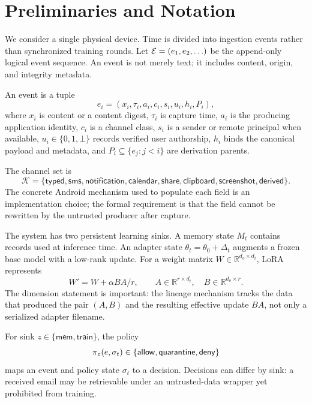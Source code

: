 \section{Preliminaries and Notation}
\label{sec:preliminaries}

We consider a single physical device. Time is divided into ingestion events rather than synchronized training rounds. Let $\mathcal{E}=(e_1,e_2,\ldots)$ be the append-only logical event sequence. An event is not merely text; it includes content, origin, and integrity metadata.

\begin{definition}
An event is a tuple
\begin{equation}
e_i=(x_i,\tau_i,a_i,c_i,s_i,u_i,h_i,P_i),
\label{eq:event}
\end{equation}
where $x_i$ is content or a content digest, $\tau_i$ is capture time, $a_i$ is the producing application identity, $c_i$ is a channel class, $s_i$ is a sender or remote principal when available, $u_i\in\{0,1,\bot\}$ records verified user authorship, $h_i$ binds the canonical payload and metadata, and $P_i\subseteq\{e_j:j<i\}$ are derivation parents.
\end{definition}

The channel set is
\begin{equation}
\mathcal{K}=\{\textsf{typed},\textsf{sms},\textsf{notification},\textsf{calendar},\textsf{share},\textsf{clipboard},\textsf{screenshot},\textsf{derived}\}.
\end{equation}
The concrete Android mechanism used to populate each field is an implementation choice; the formal requirement is that the field cannot be rewritten by the untrusted producer after capture.

The system has two persistent learning sinks. A memory state $M_t$ contains records used at inference time. An adapter state $\theta_t=\theta_0+\Delta_t$ augments a frozen base model with a low-rank update. For a weight matrix $W\in\mathbb{R}^{d_o\times d_i}$, LoRA represents
\begin{equation}
W'=W+\alpha B A/r,\qquad A\in\mathbb{R}^{r\times d_i},\quad B\in\mathbb{R}^{d_o\times r}.
\label{eq:lora}
\end{equation}
The dimension statement is important: the lineage mechanism tracks the data that produced the pair $(A,B)$ and the resulting effective update $BA$, not only a serialized adapter filename.

For sink $z\in\{\mathsf{mem},\mathsf{train}\}$, the policy
\begin{equation}
\pi_z(e,\sigma_t)\in\{\mathsf{allow},\mathsf{quarantine},\mathsf{deny}\}
\label{eq:policy}
\end{equation}
maps an event and policy state $\sigma_t$ to a decision. Decisions can differ by sink: a received email may be retrievable under an untrusted-data wrapper yet prohibited from training.

